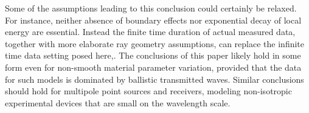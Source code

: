 
Some of the assumptions leading to this conclusion 
could certainly be relaxed. For instance, neither absence of boundary effects
nor exponential decay of local energy are essential. Instead
the finite time duration of actual measured data, together with more
elaborate ray geometry assumptions, can replace the infinite time data setting
posed here,. The conclusions of this paper likely hold in some form
even for non-smooth material parameter variation, provided that the data for such models is
dominated by ballistic transmitted waves. Similar conclusions should
hold for multipole point sources and
receivers, modeling non-isotropic experimental devices that are small on the
wavelength scale.

